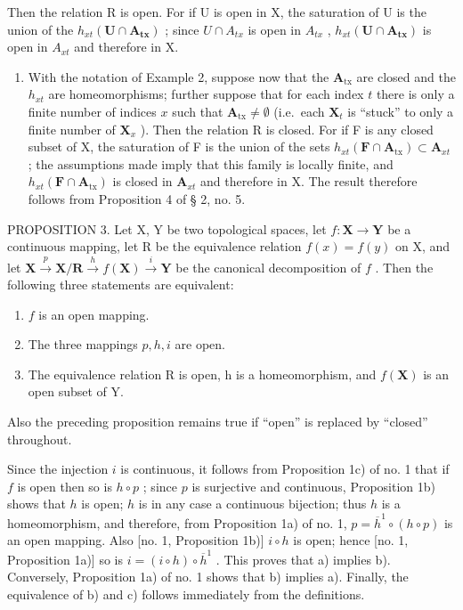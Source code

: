 Then the relation R is open. For if U is open in X, the saturation of U is the union of the \(h_{xt}(\mathbf{U} \cap \mathbf{A}_{\mathbf{tx}})\) ; since \(U \cap A_{tx}\) is open in \(A_{tx}\) , \(h_{xt}(\mathbf{U} \cap \mathbf{A}_{\mathbf{tx}})\) is open in \(A_{xt}\) and therefore in X.

\begin{enumerate}
\def\labelenumi{\arabic{enumi})}
\setcounter{enumi}{2}
\tightlist
\item
  With the notation of Example 2, suppose now that the \(\mathbf{A}_{\mathrm{tx}}\) are closed and the \(h_{xt}\) are homeomorphisms; further suppose that for each index \(t\) there is only a finite number of indices \(x\) such that \(\mathbf{A}_{\mathrm{tx}} \neq \emptyset\) (i.e.~each \(\mathbf{X}_t\) is ``stuck'' to only a finite number of \(\mathbf{X}_x\) ). Then the relation R is closed. For if F is any closed subset of X, the saturation of F is the union of the sets \(h_{xt}(\mathbf{F} \cap \mathbf{A}_{\mathrm{tx}}) \subset \mathbf{A}_{xt}\) ; the assumptions made imply that this family is locally finite, and \(h_{xt}(\mathbf{F} \cap \mathbf{A}_{\mathrm{tx}})\) is closed in \(\mathbf{A}_{xt}\) and therefore in X. The result therefore follows from Proposition 4 of § 2, no. 5.
\end{enumerate}

PROPOSITION 3. Let X, Y be two topological spaces, let \(f: \mathbf{X} \to \mathbf{Y}\) be a continuous mapping, let R be the equivalence relation \(f(x) = f(y)\) on X, and let \(\mathbf{X} \xrightarrow{p} \mathbf{X}/\mathbf{R} \xrightarrow{h} f(\mathbf{X}) \xrightarrow{i} \mathbf{Y}\) be the canonical decomposition of \(f\) . Then the following three statements are equivalent:

\begin{enumerate}
\def\labelenumi{\alph{enumi})}
\item
  \(f\) is an open mapping.
\item
  The three mappings \(p, h, i\) are open.
\item
  The equivalence relation R is open, h is a homeomorphism, and \(f(\mathbf{X})\) is an open subset of Y.
\end{enumerate}

Also the preceding proposition remains true if ``open'' is replaced by ``closed'' throughout.

Since the injection \(i\) is continuous, it follows from Proposition 1c) of no. 1 that if \(f\) is open then so is \(h \circ p\) ; since \(p\) is surjective and continuous, Proposition 1b) shows that \(h\) is open; \(h\) is in any case a continuous bijection; thus \(h\) is a homeomorphism, and therefore, from Proposition 1a) of no. 1, \(p = \overline{h}^1 \circ (h \circ p)\) is an open mapping. Also {[}no. 1, Proposition 1b){]} \(i \circ h\) is open; hence {[}no. 1, Proposition 1a){]} so is \(i = (i \circ h) \circ \overline{h}^1\) . This proves that a) implies b). Conversely, Proposition 1a) of no. 1 shows that b) implies a). Finally, the equivalence of b) and c) follows immediately from the definitions.

